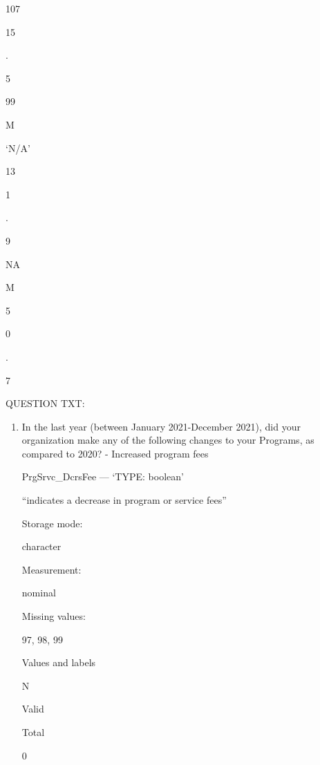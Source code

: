 \documentclass[
  letterpaper,
]{scrbook}
\providecommand{\tightlist}{%
  \setlength{\itemsep}{0pt}\setlength{\parskip}{0pt}}\usepackage{longtable,booktabs,array}
\begin{document}
\begin{enumerate}
\begin{enumerate}
\begin{enumerate}
\begin{enumerate}
\begin{enumerate}
\begin{enumerate}
\begin{enumerate}
\begin{enumerate}
\begin{enumerate}
                  107

                  15

                  .

                  5

                  99

                  M

                  `N/A'

                  13

                  1

                  .

                  9

                  NA

                  M

                  5

                  0

                  .

                  7

                  QUESTION TXT:

                  \begin{enumerate}
                  \def\labelenumx{\arabic{enumx}.}
                  \tightlist
                  \item
                    In the last year (between January 2021-December
                    2021), did your organization make any of the
                    following changes to your Programs, as compared to
                    2020? - Increased program fees

                    PrgSrvc\_DcrsFee --- {`TYPE: boolean'}

                    ``indicates a decrease in program or service fees''

                    Storage mode:

                    character

                    Measurement:

                    nominal

                    Missing values:

                    97, 98, 99

                    Values and labels

                    N

                    Valid

                    Total

                    0


\end{enumerate}
\end{enumerate}
\end{enumerate}
\end{enumerate}
\end{enumerate}
\end{enumerate}
\end{enumerate}
\end{enumerate}
\end{enumerate}
\end{enumerate}
\end{document}
